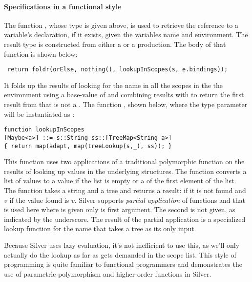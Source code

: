 \paragraph{Specifications in a functional style}
The function , whose type is given above, is used to
retrieve the reference to a variable's declaration, if it exists,
given the variables name and environment.  The result 
type is constructed from either a  or a 
production.  The body of that function is shown below:
\begin{verbatim}
 return foldr(orElse, nothing(), lookupInScopes(s, e.bindings)); 
\end{verbatim}
It folds up the results of looking for the name  in all the
scopes in the the environment using a base-value of  and
combining results with  to return the first result from
 that is not a .
%
The function , shown below, where the type
parameter  will be instantiated as :
\begin{verbatim}
function lookupInScopes
[Maybe<a>] ::= s::String ss::[TreeMap<String a>]
{ return map(adapt, map(treeLookup(s,_), ss)); }
\end{verbatim}
This function uses two applications of a
traditional polymorphic  function on the results of looking
up values in the underlying  structures.  The
 function converts a list of values to a  value
if the list is empty or a  of the first element of the
list.
%
The  function takes a string and a tree and returns a
 result:  if it is not found and
$v$\code{)} if the value found is $v$.  Silver supports
\emph{partial application} of functions and that is used here where
 is given only is first argument.  The second is not
given, as indicated by the underscore.  The result of the partial
application is a specialized lookup function for the name 
that takes a tree as its only input.

Because Silver uses lazy evaluation, it's not inefficient to use this,
as we'll only actually do the lookup as far as gets demanded in the
scope list.  This style of programming is quite familiar to functional
programmers and demonstrates the use of parametric polymorphism and
higher-order functions in Silver.

